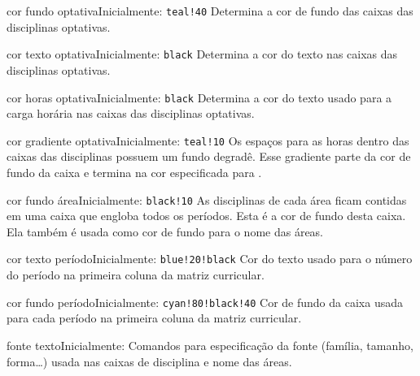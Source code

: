 \documentclass[a4paper, 11pt]{article}
\begin{document}
\begin{Optiondef}{cor fundo optativa}{}{Inicialmente: \texttt{teal!40}}
    Determina a cor de fundo das caixas das disciplinas optativas.
\end{Optiondef}

\begin{Optiondef}{cor texto optativa}{}{Inicialmente: \texttt{black}}
    Determina a cor do texto nas caixas das disciplinas optativas.
\end{Optiondef}

\begin{Optiondef}{cor horas optativa}{}{Inicialmente: \texttt{black}}
    Determina a cor do texto usado para a carga horária nas caixas das disciplinas optativas.
\end{Optiondef}

\begin{Optiondef}{cor gradiente optativa}{}{Inicialmente: \texttt{teal!10}}
    Os espaços para as horas dentro das caixas das disciplinas possuem um fundo degradê. Esse gradiente parte da cor de fundo da caixa e termina na cor especificada para .
\end{Optiondef}

\begin{Optiondef}{cor fundo área}{}{Inicialmente: \texttt{black!10}}
    As disciplinas de cada área ficam contidas em uma caixa que engloba todos os períodos. Esta é a cor de fundo desta caixa. Ela também é usada como cor de fundo para o nome das áreas.
\end{Optiondef}

\begin{Optiondef}{cor texto período}{}{Inicialmente: \texttt{blue!20!black}}
    Cor do texto usado para o número do período na primeira coluna da matriz curricular.
\end{Optiondef}

\begin{Optiondef}{cor fundo período}{}{Inicialmente: \texttt{cyan!80!black!40}}
    Cor de fundo da caixa usada para cada período na primeira coluna da matriz curricular.
\end{Optiondef}

\begin{Optiondef}{fonte texto}{}{Inicialmente: \PDInline{\sffamily\bfseries\small}}
    Comandos para especificação da fonte (família, tamanho, forma\ldots) usada nas caixas de disciplina e nome das áreas.
\end{Optiondef}
\end{document}
